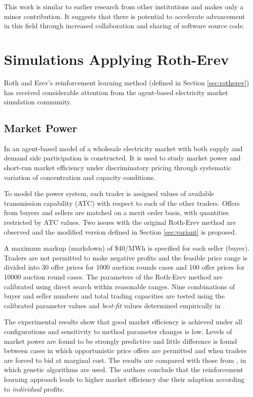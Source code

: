 This work is similar to earlier research from other institutions and makes only
a minor contribution.  It suggests that there is potential to accelerate
advancement in this field through increased collaboration and sharing of
software source code.

\section{Simulations Applying Roth-Erev}
Roth and Erev's reinforcement learning method (defined in Section
\ref{sec:rotherev}) has received considerable attention from the
agent-based electricity market simulation community.

\subsection{Market Power}
In  an agent-based model of a wholesale electricity market
with both supply and demand side participation is constructed.  It is used to
study market power and short-run market efficiency under discriminatory pricing
through systematic variation of concentration and capacity conditions.

To model the power system, each trader is assigned values of available
transmission capability (ATC) with respect to each of the other traders.
Offers from buyers and sellers are matched on a merit order basis, with quantities restricted by
ATC values.  Two issues with the original Roth-Erev method are observed and
the modified version defined in Section \ref{sec:variant} is proposed.

A maximum markup (markdown) of \$40/MWh is specified for each seller (buyer).
Traders are not permitted to make negative profits and the feasible price range
is divided into 30 offer prices for 1000 auction rounds cases and 100 offer
prices for 10000 auction round cases.  The parameters of the Roth-Erev method
are calibrated using direct search within reasonable ranges.  Nine combinations of
buyer and seller numbers and total trading capacities are tested using the
calibrated parameter values and \textit{best-fit} values determined
empirically in .

The experimental results show that good market efficiency is achieved under all
configurations and sensitivity to method parameter changes is low.  Levels of
market power are found to be strongly predictive and little difference is found
between cases in which opportunistic price offers are permitted and when traders
are forced to bid at marginal cost.  The results are compared with those from
, in which genetic algorithms are used.  The authors
conclude that the reinforcement learning approach leads to higher market
efficiency due their adaption according to \textit{individual} profits.

